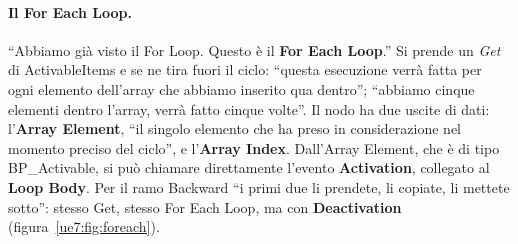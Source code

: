 \paragraph{Il For Each Loop.} ``Abbiamo già visto il For Loop. Questo è il \textbf{For
Each Loop}.'' Si prende un \emph{Get} di ActivableItems e se ne tira fuori il ciclo:
``questa esecuzione verrà fatta per ogni elemento dell'array che abbiamo inserito qua
dentro''; ``abbiamo cinque elementi dentro l'array, verrà fatto cinque volte''. Il nodo ha
due uscite di dati: l'\textbf{Array Element}, ``il singolo elemento che ha preso in
considerazione nel momento preciso del ciclo'', e l'\textbf{Array Index}. Dall'Array
Element, che è di tipo BP\_Activable, si può chiamare direttamente l'evento
\textbf{Activation}, collegato al \textbf{Loop Body}. Per il ramo Backward ``i primi due
li prendete, li copiate, li mettete sotto'': stesso Get, stesso For Each Loop, ma con
\textbf{Deactivation} (figura~\ref{ue7:fig:foreach}).

